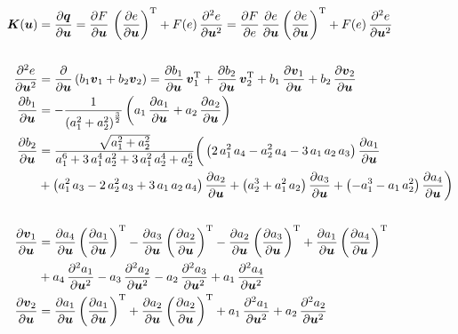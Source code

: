\begin{align*}
\boldsymbol{K}(\boldsymbol{u}) &= \frac{\partial \boldsymbol{q}}{\partial \boldsymbol{u}} = \frac{\partial F}{\partial \boldsymbol{u}}\,\left(\frac{\partial e}{\partial \boldsymbol{u}}\right)^{\rm{T}} + F(e)\,\frac{\partial^2 e}{\partial \boldsymbol{u}^2} = \frac{\partial F}{\partial e}\,\frac{\partial e}{\partial \boldsymbol{u}}\left(\frac{\partial e}{\partial \boldsymbol{u}}\right)^{\rm{T}} + F(e)\,\frac{\partial^2 e}{\partial \boldsymbol{u}^2}\\
\\
\frac{\partial^2 e}{\partial \boldsymbol{u}^2} &= \frac{\partial}{\partial \boldsymbol{u}}\left(b_1\boldsymbol{v}_1 + b_2\boldsymbol{v}_2\right) = \frac{\partial b_1}{\partial \boldsymbol{u}}\,\boldsymbol{v}_1^{\rm{T}} + \frac{\partial b_2}{\partial \boldsymbol{u}}\,\boldsymbol{v}_2^{\rm{T}} + b_1\,\frac{\partial \boldsymbol{v}_1}{\partial \boldsymbol{u}} + b_2\,\frac{\partial \boldsymbol{v}_2}{\partial \boldsymbol{u}}\\
\frac{\partial b_1}{\partial \boldsymbol{u}} &= -\frac{1}{\left(a_1^2 + a_2^2\right)^{\frac{3}{2}}}\left(a_1\,\frac{\partial a_1}{\partial \boldsymbol{u}} + a_2\,\frac{\partial a_2}{\partial \boldsymbol{u}}\right)\\
\frac{\partial b_2}{\partial \boldsymbol{u}} &= \frac{\sqrt{a_1^2 + a_2^2}}{a_1^6 + 3\,a_1^4\,a_2^2 + 3\,a_1^2\,a_2^4 + a_2^6}\bigg(\left(2\,a_1^2\,a_4 - a_2^2\,a_4 - 3\,a_1\,a_2\,a_3\right)\frac{\partial a_1}{\partial \boldsymbol{u}}\\
&+ \left(a_1^2\,a_3 - 2\,a_2^2\,a_3 + 3\,a_1\,a_2\,a_4\right)\frac{\partial a_2}{\partial \boldsymbol{u}} + \left(a_2^3 + a_1^2\,a_2\right)\frac{\partial a_3}{\partial \boldsymbol{u}} + \left(-a_1^3 - a_1\,a_2^2\right)\frac{\partial a_4}{\partial \boldsymbol{u}}\bigg)\\
\\
\frac{\partial \boldsymbol{v}_1}{\partial \boldsymbol{u}} &= \frac{\partial a_4}{\partial \boldsymbol{u}}\left(\frac{\partial a_1}{\partial \boldsymbol{u}}\right)^{\rm{T}} - \frac{\partial a_3}{\partial \boldsymbol{u}}\left(\frac{\partial a_2}{\partial \boldsymbol{u}}\right)^{\rm{T}} - \frac{\partial a_2}{\partial \boldsymbol{u}}\left(\frac{\partial a_3}{\partial \boldsymbol{u}}\right)^{\rm{T}} + \frac{\partial a_1}{\partial \boldsymbol{u}}\left(\frac{\partial a_4}{\partial \boldsymbol{u}}\right)^{\rm{T}}\\
&+ a_4\,\frac{\partial^2 a_1}{\partial \boldsymbol{u}^2} - a_3\,\frac{\partial^2 a_2}{\partial \boldsymbol{u}^2} - a_2\,\frac{\partial^2 a_3}{\partial \boldsymbol{u}^2} + a_1\,\frac{\partial^2 a_4}{\partial \boldsymbol{u}^2}\\
\frac{\partial \boldsymbol{v}_2}{\partial \boldsymbol{u}} &=  \frac{\partial a_1}{\partial \boldsymbol{u}}\left(\frac{\partial a_1}{\partial \boldsymbol{u}}\right)^{\rm{T}} + \frac{\partial a_2}{\partial \boldsymbol{u}}\left(\frac{\partial a_2}{\partial \boldsymbol{u}}\right)^{\rm{T}} + a_1\,\frac{\partial^2 a_1}{\partial \boldsymbol{u}^2} + a_2\,\frac{\partial^2 a_2}{\partial \boldsymbol{u}^2}
\end{align*}

